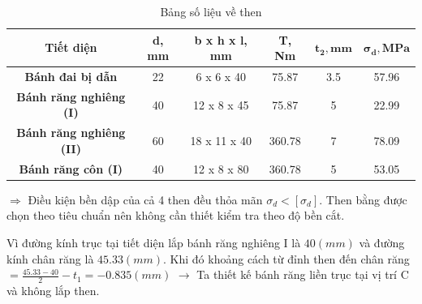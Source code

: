 \begin{itemize}
\begin{itemize}
\begin{table}[H]
\begin{tabular}{|c|c|c|c|c|c|}
                                    \hline
                                    \textbf{Tiết diện} & \textbf{d, mm} & \textbf{b x h x l, mm} & \textbf{T, Nm} & $\mathbf{t_{2}, mm}$ & $\mathbf{\sigma_{d}, MPa}$ \\
                                    \hline
                                    \textbf{Bánh đai bị dẫn} & 22 & 6 x 6 x 40  & 75.87 & 3.5 & 57.96  \\
                                    \hline
                                    \textbf{Bánh răng nghiêng (I)} & 40 & 12 x 8 x 45 & 75.87 & 5 & 22.99  \\
                                    \hline
                                    \textbf{Bánh răng nghiêng (II)} & 60 & 18 x 11 x 40 & 360.78 & 7 & 78.09  \\
                                    \hline
                                    \textbf{Bánh răng côn (I)} & 40 & 12 x 8 x 80 & 360.78 & 5 & 53.05 \\
                                    \hline
                                \end{tabular}
                                \caption{Bảng số liệu về then}
                            \end{table}
                            $\Rightarrow$ Điều kiện bền dập của cả 4 then đều thỏa mãn $\sigma_{d} < [\sigma_{d}]$. Then bằng được chọn theo tiêu chuẩn nên không cần thiết kiểm tra theo độ bền cắt.
                    \end{itemize}
                    \hspace*{0.6cm}Vì đường kính trục tại tiết diện lắp bánh răng nghiêng I là $40 (mm)$ và đường kính chân răng là $45.33 (mm)$. Khi đó khoảng cách từ đỉnh then đến chân răng $ = \frac{45.33 - 40}{2} - t_1 = -0.835 (mm)$ $\rightarrow$ Ta thiết kế bánh răng liền trục tại vị trí C và không lắp then.
            \end{itemize}

